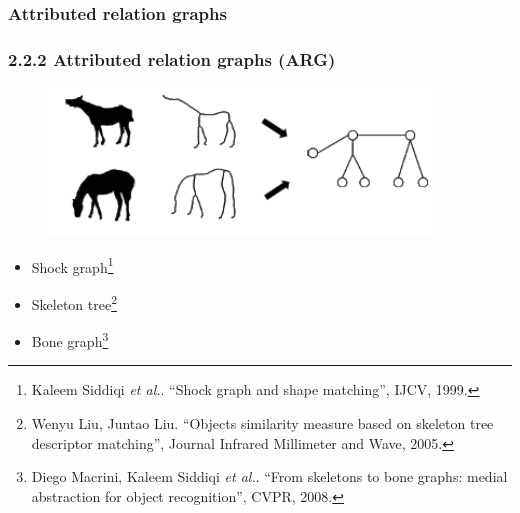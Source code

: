 \documentclass[notheorems,serif,table,compress]{beamer}  %
\begin{document}
\subsubsection{Attributed relation graphs}
\begin{frame}
\frametitle{2.2.2 Attributed relation graphs (ARG)}
            \begin{figure}
              \centering
              \includegraphics[width=0.5\linewidth]{gujia} 
            \end{figure}
    \begin{itemize}
        \item Shock graph\footnote{Kaleem Siddiqi \textit{et al.}. ``Shock graph and shape matching'', IJCV, 1999.}
        \item Skeleton tree\footnote{Wenyu Liu, Juntao Liu. ``Objects similarity measure based on skeleton tree descriptor matching'', Journal Infrared Millimeter and Wave, 2005.}
        \item Bone graph\footnote{Diego Macrini, Kaleem Siddiqi \textit{et al.}. ``From skeletons to bone graphs: medial abstraction for object recognition'', CVPR, 2008.}
    \end{itemize}
\end{frame}
\end{document}
